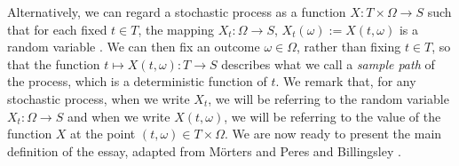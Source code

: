 \documentclass[a4paper,11pt]{article}
\theoremstyle{plain}
\theoremstyle{definition}
\newtheorem{definition}[theorem]{Definition}
\begin{document}
Alternatively, we can regard a stochastic process as a function $X:T \times \Omega \to S$ such that for each fixed $t \in T$, the mapping $X_t:\Omega \to S$, $X_t(\omega) := X(t,\omega)$ is a random variable \citep[p.~2]{JL}. We can then fix an outcome $\omega \in \Omega$, rather than fixing $t \in T$, so that the function $t \mapsto X(t,\omega):T \to S$ describes what we call a \textit{sample path} of the process, which is a deterministic function of $t$. We remark that, for any stochastic process, when we write $X_t$, we will be referring to the random variable $X_t:\Omega \to S$ and when we write $X(t,\omega)$, we will be referring to the value of the function $X$ at the point $(t,\omega) \in T \times \Omega$. We are now ready to present the main definition of the essay, adapted from M\"orters and Peres \citep[p.~7]{M&P} and Billingsley \citep[p.~498]{PB}.

\end{document}
